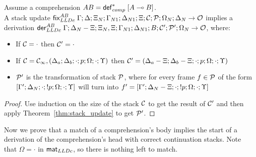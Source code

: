 \begin{theorem}\label{thm:from_update_to_derivation}

Assume a comprehension $AB = \mathsf{def}_{comp}^{*} \; [A \multimap B]$. \\ A stack update
$\mathsf{fix}_{LLDc}^{AB} \; \Gamma; \Delta; \Xi_N; \Gamma_{N1}; \Delta_{N1}; \Xi; \mathcal{C};
\mathcal{P}; \Omega_N; \Delta_N \rightarrow \mathcal{O}$ implies a derivation \texttab$\mathsf{der}_{LLDc}^{AB} \;
\Gamma; \Delta_N - \Xi; \Xi_N, \Xi; \Gamma_{N1}; \Delta_{N1}; B; \mathcal{C'} ;
\mathcal{P'}; \Omega_N \rightarrow \mathcal{O}$, where:

\begin{itemize}[leftmargin=*]
   \item If $\mathcal{C} = \cdot$ then $\mathcal{C'} = \cdot$

   \item If $\mathcal{C} = \mathcal{C_1}, (\Delta_a; \Delta_b; \cdot; p; \Omega; \cdot; \Upsilon)$
   then $\mathcal{C'} = (\Delta_a - \Xi; \Delta_b - \Xi; \cdot; p; \Omega; \cdot;
         \Upsilon)$

   \item $\mathcal{P'}$ is the transformation of stack $\mathcal{P}$, where for every frame $f \in
   \mathcal{P}$ of the form $[\Gamma'; \Delta_N; \cdot; {!} p; \Omega; \cdot; \Upsilon]$
   will turn into $f' = [\Gamma';\Delta_N-\Xi;\cdot;{!} p;\Omega;\cdot;\Upsilon]$

\end{itemize}
\end{theorem}
\begin{proof}
Use induction on the size of the stack $\mathcal{C}$ to get the result of
$\mathcal{C'}$ and then apply Theorem~\ref{thm:stack_update} to get
$\mathcal{P'}$.
\end{proof}


Now we prove that a match of a comprehension's body implies the start of a
derivation of the comprehension's head with correct continuation stacks. Note
that $\Omega = \cdot$ in $\mathsf{mat}_{LLDc}$, so there is nothing left to match.

